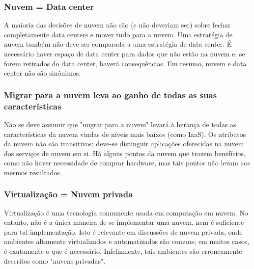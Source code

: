     \subsubsection{Nuvem = Data center}

    A maioria das decisões de nuvem não são (e não deveriam ser) sobre fechar
    completamente data centers e mover tudo para a nuvem. Uma estratégia de nuvem
    também não deve ser comparada a uma estratégia de data center. É necessário haver
    espaço de data center para dados que não estão na nuvem e, se forem retirados do
    data center, haverá consequências. Em resumo, nuvem e data center não são
    sinônimos.

    \subsubsection{Migrar para a nuvem leva ao ganho de todas as suas
                   características}

    Não se deve assumir que "migrar para a nuvem" levará à herança de todas as
    características da nuvem vindas de níveis mais baixos (como IaaS). Os atributos
    da nuvem não são transitivos; deve-se distinguir aplicações oferecidas na nuvem
    dos serviços de nuvem em si. Há alguns pontos da nuvem que trazem benefícios,
    como não haver necessidade de comprar hardware, mas tais pontos não levam aos
    mesmos resultados.

    \subsubsection{Virtualização = Nuvem privada}

    Virtualização é uma tecnologia comumente usada em computação em nuvem. No
    entanto, não é a única maneira de se implementar uma nuvem, nem é suficiente
    para tal implementação. Isto é relevante em discussões de nuvem privada, onde
    ambientes altamente virtualizados e automatizados são comuns; em muitos casos,
    é exatamente o que é necessário. Infelizmente, tais ambientes são erroneamente
    descritos como "nuvens privadas".
